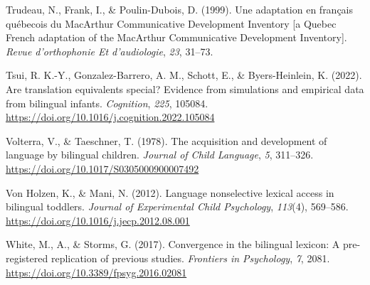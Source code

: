 \documentclass[
  ,man,floatsintext]{apa6}
\newlength{\cslhangindent}
\newlength{\cslentryspacingunit} %
\newenvironment{CSLReferences}[2] %
 {%
  \setlength{\parindent}{0pt}
  \ifodd #1
  \let\oldpar\par
  \def\par{\hangindent=\cslhangindent\oldpar}
  \fi
  \setlength{\parskip}{#2\cslentryspacingunit}
 }%
 {}
\begin{document}
\begin{CSLReferences}{1}{0}
\leavevmode{}%
Trudeau, N., Frank, I., \& Poulin-Dubois, D. (1999). Une adaptation en français québecois du MacArthur {C}ommunicative {D}evelopment {I}nventory {[}a {Q}uebec {F}rench adaptation of the MacArthur {C}ommunicative {D}evelopment {I}nventory{]}. \emph{Revue d'orthophonie Et d'audiologie}, \emph{23}, 31--73.

\leavevmode{}%
Tsui, R. K.-Y., Gonzalez-Barrero, A. M., Schott, E., \& Byers-Heinlein, K. (2022). Are translation equivalents special? Evidence from simulations and empirical data from bilingual infants. \emph{Cognition}, \emph{225}, 105084. \url{https://doi.org/10.1016/j.cognition.2022.105084}

\leavevmode{}%
Volterra, V., \& Taeschner, T. (1978). The acquisition and development of language by bilingual children. \emph{Journal of Child Language}, \emph{5}, 311--326. \url{https://doi.org/10.1017/S0305000900007492}

\leavevmode{}%
Von Holzen, K., \& Mani, N. (2012). Language nonselective lexical access in bilingual toddlers. \emph{Journal of Experimental Child Psychology}, \emph{113}(4), 569--586. \url{https://doi.org/10.1016/j.jecp.2012.08.001}

\leavevmode{}%
White, M., A., \& Storms, G. (2017). Convergence in the bilingual lexicon: A pre-registered replication of previous studies. \emph{Frontiers in Psychology}, \emph{7}, 2081. \url{https://doi.org/10.3389/fpsyg.2016.02081}

\end{CSLReferences}

\endgroup
\end{document}
